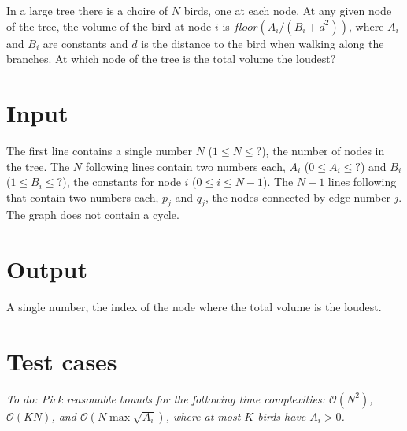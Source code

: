 In a large tree there is a choire of $N$ birds, one at each node. At any given node of the tree, the volume of the bird at node $i$ is $floor(A_i / (B_i + d^2))$, where $A_i$ and $B_i$ are constants and $d$ is the distance to the bird when walking along the branches. At which node of the tree is the total volume the loudest?

\section*{Input}
The first line contains a single number $N$ ($1 \le N \le ?$), the number of nodes in the tree. The $N$ following lines contain two numbers each, $A_i$ ($0 \le A_i \le ?$) and $B_i$ ($1 \le B_i \le ?$), the constants for node $i$ ($0 \le i \le N-1$). The $N-1$ lines following that contain two numbers each, $p_j$ and $q_j$, the nodes connected by edge number $j$. The graph does not contain a cycle.

\section*{Output}
A single number, the index of the node where the total volume is the loudest.

\section*{Test cases}
\textit{To do: Pick reasonable bounds for the following time complexities: $\mathcal{O}(N^2)$, $\mathcal{O}(KN)$, and $\mathcal{O}(N \max \sqrt {A_i})$, where at most $K$ birds have $A_i > 0$.}
